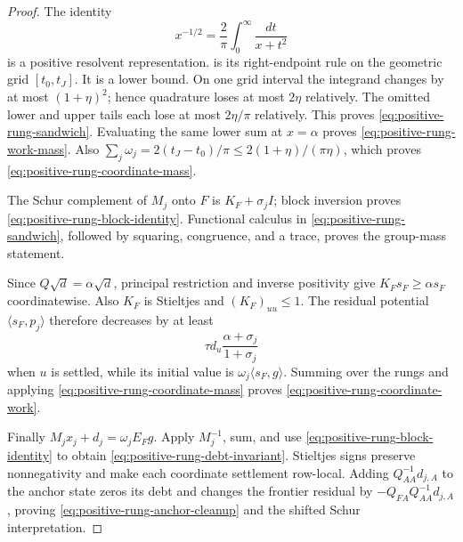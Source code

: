 \begin{proof}
The identity
\begin{equation*}
 x^{-1/2}=\frac2\pi\int_0^\infty\frac{dt}{x+t^2}
\end{equation*}
is a positive resolvent representation.  
is its right-endpoint rule on the geometric
grid $[t_0,t_J]$.  It is a lower bound.  On one grid interval the integrand
changes by at most $(1+\eta)^2$; hence quadrature loses at most $2\eta$
relatively.  The omitted lower and upper tails each lose at most
$2\eta/\pi$ relatively.  This proves
\cref{eq:positive-rung-sandwich}.  Evaluating the same lower sum at
$x=\alpha$ proves
\cref{eq:positive-rung-work-mass}.  Also
$\sum_j\omega_j=2(t_J-t_0)/\pi\leq2(1+\eta)/(\pi\eta)$, which proves
\cref{eq:positive-rung-coordinate-mass}.

The Schur complement of $M_j$ onto $F$ is
$K_F+\sigma_jI$; block inversion proves
\cref{eq:positive-rung-block-identity}.  Functional calculus in
\cref{eq:positive-rung-sandwich}, followed by squaring, congruence, and a
trace, proves the group-mass statement.

Since $Q\sqrt d=\alpha\sqrt d$, principal restriction and inverse positivity
give $K_Fs_F\geq\alpha s_F$ coordinatewise.  Also $K_F$ is Stieltjes and
$(K_F)_{uu}\leq1$.  The residual potential
$\langle s_F,p_j\rangle$ therefore decreases by at least
\begin{equation*}
 \tau d_u\frac{\alpha+\sigma_j}{1+\sigma_j}
\end{equation*}
when $u$ is settled, while its initial value is
$\omega_j\langle s_F,g\rangle$.  Summing over the rungs and applying
\cref{eq:positive-rung-coordinate-mass} proves
\cref{eq:positive-rung-coordinate-work}.

Finally $M_jx_j+d_j=\omega_jE_Fg$.  Apply $M_j^{-1}$, sum, and use
\cref{eq:positive-rung-block-identity} to obtain
\cref{eq:positive-rung-debt-invariant}.  Stieltjes signs preserve
nonnegativity and make each coordinate settlement row-local.  Adding
$Q_{AA}^{-1}d_{j,A}$ to the anchor state zeros its debt and changes the
frontier residual by $-Q_{FA}Q_{AA}^{-1}d_{j,A}$, proving
\cref{eq:positive-rung-anchor-cleanup} and the shifted Schur interpretation.
\end{proof}


